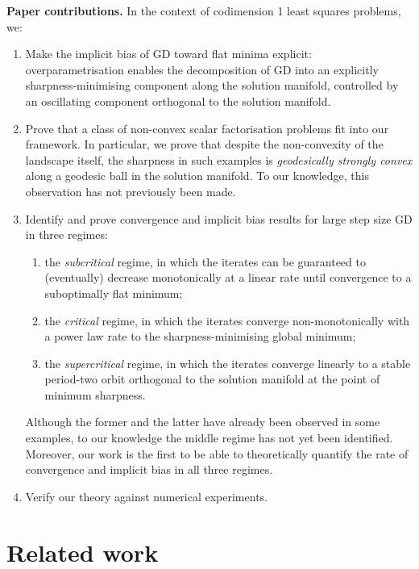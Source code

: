 \documentclass{article}
\newcommand{\myparagraph}[1]{\noindent\textbf{#1.}}
\theoremstyle{plain}
\theoremstyle{definition}
\theoremstyle{remark}
\begin{document}
\myparagraph{Paper contributions} In the context of codimension 1 least squares problems, we:
\begin{enumerate}[leftmargin=*]
    \item Make the implicit bias of GD toward flat minima explicit: overparametrisation enables the decomposition of GD into an explicitly sharpness-minimising component along the solution manifold, controlled by an oscillating component orthogonal to the solution manifold.
    \item Prove that a class of non-convex scalar factorisation problems fit into our framework. In particular, we prove that despite the non-convexity of the landscape itself, the sharpness in such examples is \emph{geodesically strongly convex} along a geodesic ball in the solution manifold. To our knowledge, this observation has not previously been made.
    \item Identify and prove convergence and implicit bias results for large step size GD in three regimes: 
    
    \begin{enumerate}
        \item the \emph{subcritical} regime, in which the iterates can be guaranteed to (eventually) decrease monotonically at a linear rate until convergence to a suboptimally flat minimum; 
        \item the \emph{critical} regime, in which the iterates converge non-monotonically with a power law rate to the sharpness-minimising global minimum; 
        \item the \emph{supercritical} regime, in which the iterates converge linearly to a stable period-two orbit orthogonal to the solution manifold at the point of minimum sharpness. 
    \end{enumerate}
    Although the former and the latter have already been observed in some examples, to our knowledge the middle regime has not yet been identified. Moreover, our work is the first to be able to theoretically quantify the rate of convergence and implicit bias in all three regimes.
    \item Verify our theory against numerical experiments.
\end{enumerate}

\section{Related work}
\end{document}
